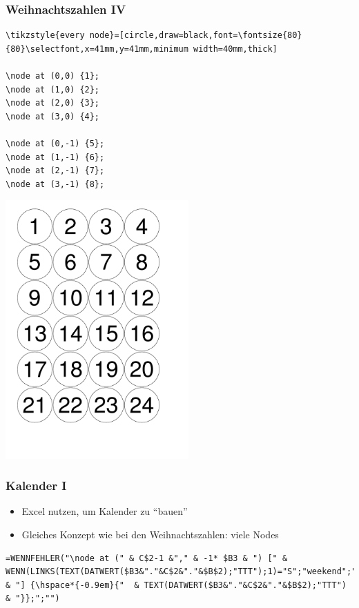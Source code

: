 \documentclass[14pt,ngerman]{beamer}
\begin{document}
\begin{frame}[containsverbatim]
\frametitle{Weihnachtszahlen IV}


\begin{lstlisting}
\tikzstyle{every node}=[circle,draw=black,font=\fontsize{80}{80}\selectfont,x=41mm,y=41mm,minimum width=40mm,thick]

\node at (0,0) {1};
\node at (1,0) {2};
\node at (2,0) {3};
\node at (3,0) {4};

\node at (0,-1) {5};
\node at (1,-1) {6};
\node at (2,-1) {7};
\node at (3,-1) {8};
\end{lstlisting}
\end{frame}

\begin{frame}

\begin{center}
\includegraphics[width=7cm]{./Examples/Weihnachtszahlen-3}
\end{center}
\end{frame}


\begin{frame}[containsverbatim]
\frametitle{Kalender I}

\begin{itemize}
	\item Excel nutzen, um Kalender zu \enquote{bauen}
	\item Gleiches Konzept wie bei den Weihnachtszahlen: viele Nodes
\end{itemize}

\begin{lstlisting}
=WENNFEHLER("\node at (" & C$2-1 &"," & -1* $B3 & ") [" & WENN(LINKS(TEXT(DATWERT($B3&"."&C$2&"."&$B$2);"TTT");1)="S";"weekend";"workday") & "] {\hspace*{-0.9em}{"  & TEXT(DATWERT($B3&"."&C$2&"."&$B$2);"TTT")   & "}};";"")
\end{lstlisting}
\end{frame}
\end{document}
